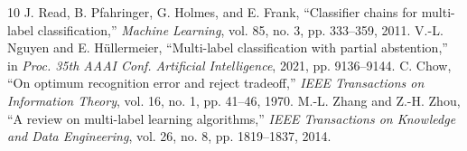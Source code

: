 \documentclass[10pt,a4paper,twoside]{article}
\begin{document}
\begin{thebibliography}{10}
 J. Read, B. Pfahringer, G. Holmes, and E. Frank, ``Classifier chains for multi-label classification,'' \textit{Machine Learning}, vol. 85, no. 3, pp. 333--359, 2011.
 V.-L. Nguyen and E. H{\"u}llermeier, ``Multi-label classification with partial abstention,'' in \textit{Proc. 35th AAAI Conf. Artificial Intelligence}, 2021, pp. 9136--9144.
 C. Chow, ``On optimum recognition error and reject tradeoff,'' \textit{IEEE Transactions on Information Theory}, vol. 16, no. 1, pp. 41--46, 1970.
 M.-L. Zhang and Z.-H. Zhou, ``A review on multi-label learning algorithms,'' \textit{IEEE Transactions on Knowledge and Data Engineering}, vol. 26, no. 8, pp. 1819--1837, 2014.
\end{thebibliography}
\end{document}
